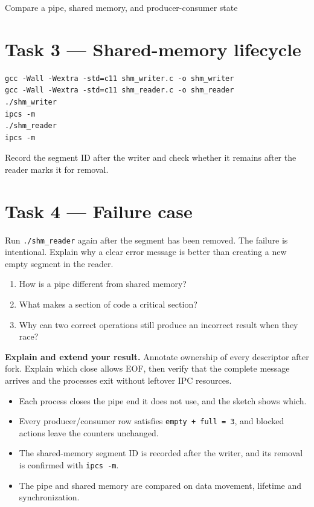 \begin{labproject}{Compare a pipe, shared memory, and producer-consumer state}
\section*{Task 3 --- Shared-memory lifecycle}
\begin{lstlisting}[style=utpbash]
gcc -Wall -Wextra -std=c11 shm_writer.c -o shm_writer
gcc -Wall -Wextra -std=c11 shm_reader.c -o shm_reader
./shm_writer
ipcs -m
./shm_reader
ipcs -m
\end{lstlisting}
Record the segment ID after the writer and check whether it remains after the reader marks it for removal.

\section*{Task 4 --- Failure case}
Run \texttt{./shm\_reader} again after the segment has been removed. The failure is intentional. Explain why a clear error message is better than creating a new empty segment in the reader.

\begin{quickcheck}
\begin{enumerate}
  \item How is a pipe different from shared memory?
  \item What makes a section of code a critical section?
  \item Why can two correct operations still produce an incorrect result when they race?
\end{enumerate}
\end{quickcheck}

\begin{verification}
\textbf{Explain and extend your result.} Annotate ownership of every descriptor after fork. Explain which close allows EOF, then verify that the complete message arrives and the processes exit without leftover IPC resources.


\begin{itemize}
  \item Each process closes the pipe end it does not use, and the sketch shows which.
  \item Every producer/consumer row satisfies \texttt{empty + full = 3}, and blocked actions leave the counters unchanged.
  \item The shared-memory segment ID is recorded after the writer, and its removal is confirmed with \texttt{ipcs -m}.
  \item The pipe and shared memory are compared on data movement, lifetime and synchronization.
\end{itemize}
\end{verification}
\end{labproject}
